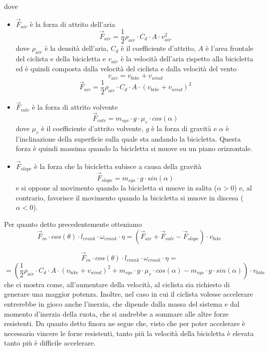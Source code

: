 \documentclass[class=article]{standalone}
\begin{document}
	dove	
	\begin{itemize}
		\item \(\vec{F}_{air}\) è la forza di attrito dell'aria
		\[\vec{F}_{air}=\frac{1}{2}\rho_{air}\cdot C_{d}\cdot A\cdot v_{air}^2\]
		dove \(\rho_{air}\) è la densità dell'aria, \(C_{d}\) è il coefficiente d'attrito, \(A\) è l'area frontale del ciclista e della bicicletta e \(v_{air}\) è la velocità dell'aria rispetto alla bicicletta ed è quindi composta dalla velocità del ciclista e dalla velocità del vento 
		\[v_{air}=v_{bike}+v_{wind}\]
		\[\vec{F}_{air}=\frac{1}{2}\rho_{air}\cdot C_{d}\cdot A\cdot (v_{bike}+v_{wind})^2\]
		
		\item \(\vec{F}_{volv}\) è la forza di attrito volvente
		\[\vec{F}_{volv}=m_{sys}\cdot g\cdot \mu_{v}\cdot cos(\alpha)\]
		dove \(\mu_{v}\) è il coefficiente d'attrito volvente, \(g\) è la forza di gravità e \(\alpha\) è l'inclinazione della superficie sulla quale sta andando la bicicletta. Questa forza è quindi massima quando la bicicletta si muove su un piano orizzontale.
		
		\item \(\vec{F}_{slope}\) è la forza che la bicicletta subisce a causa della gravità
		\[\vec{F}_{slope}=m_{sys}\cdot g\cdot sin(\alpha)\]
		e si oppone al movimento quando la bicicletta si muove in salita (\(\alpha > 0\)) e, al contrario, favorisce il movimento quando la bicicletta si muove in discesa (\(\alpha < 0\)).
	\end{itemize}
	
	Per quanto detto precedentemente otteniamo
	\[\vec{F}_{in}\cdot cos(\theta)\cdot l_{crank}\cdot \omega_{crank}\cdot\eta=(\vec{F}_{air}+\vec{F}_{volv}-\vec{F}_{slope})\cdot v_{bike}\]
	
	\[\vec{F}_{in}\cdot cos(\theta)\cdot l_{crank}\cdot \omega_{crank}\cdot\eta=\]
	\[=(\frac{1}{2}\rho_{air}\cdot C_{d}\cdot A\cdot (v_{bike}+v_{wind})^2+m_{sys}\cdot g\cdot \mu_{v}\cdot cos(\alpha)-m_{sys}\cdot g\cdot sin(\alpha))\cdot v_{bike}\]
	che ci mostra come, all'aumentare della velocità, al ciclista sia richiesto di generare una maggior potenza. Inoltre, nel caso in cui il ciclista volesse accelerare entrerebbe in gioco anche l'inerzia, che dipende dalla massa del sistema e dal momento d'inerzia della ruota, che si andrebbe a sommare alle altre forze resistenti.
	Da quanto detto finora ne segue che, visto che per poter accelerare è necessario vincere le forze resistenti, tanto più la velocità della bicicletta è elevata tanto più è difficile accelerare.
			
\end{document}
